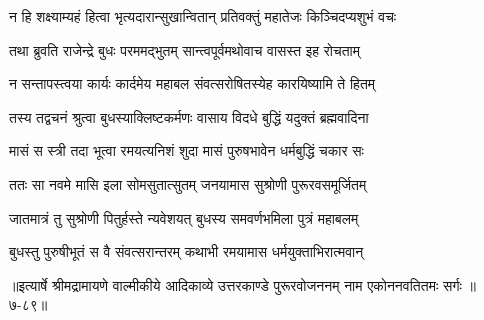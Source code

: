 \twolineshloka
{न हि शक्ष्याम्यहं हित्वा भृत्यदारान्सुखान्वितान्}
{प्रतिवक्तुं महातेजः किञ्चिदप्यशुभं वचः} %

\twolineshloka
{तथा ब्रुवति राजेन्द्रे बुधः परममद्भुतम्}
{सान्त्वपूर्वमथोवाच वासस्त इह रोचताम्} %

\twolineshloka
{न सन्तापस्त्वया कार्यः कार्दमेय महाबल}
{संवत्सरोषितस्येह कारयिष्यामि ते हितम्} %

\twolineshloka
{तस्य तद्वचनं श्रुत्वा बुधस्याक्लिष्टकर्मणः}
{वासाय विदधे बुद्धिं यदुक्तं ब्रह्मवादिना} %

\twolineshloka
{मासं स स्त्री तदा भूत्वा रमयत्यनिशं शुदा}
{मासं पुरुषभावेन धर्मबुद्धिं चकार सः} %

\twolineshloka
{ततः सा नवमे मासि इला सोमसुतात्सुतम्}
{जनयामास सुश्रोणी पुरूरवसमूर्जितम्} %

\twolineshloka
{जातमात्रं तु सुश्रोणी पितुर्हस्ते न्यवेशयत्}
{बुधस्य समवर्णभमिला पुत्रं महाबलम्} %

\twolineshloka
{बुधस्तु पुरुषीभूतं स वै संवत्सरान्तरम्}
{कथाभी रमयामास धर्मयुक्ताभिरात्मवान्} %


॥इत्यार्षे श्रीमद्रामायणे वाल्मीकीये आदिकाव्ये उत्तरकाण्डे पुरूरवोजननम् नाम एकोननवतितमः सर्गः ॥७-८९॥
